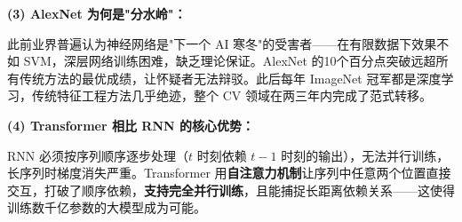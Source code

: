 \documentclass[a4paper,11pt]{ctexart}
\begin{document}
\begin{solutionbox}[参考答案与详细解析]
    \textbf{(3) AlexNet 为何是"分水岭"：}

    此前业界普遍认为神经网络是"下一个 AI 寒冬"的受害者——在有限数据下效果不如 SVM，深层网络训练困难，缺乏理论保证。AlexNet 的10个百分点突破远超所有传统方法的最优成绩，让怀疑者无法辩驳。此后每年 ImageNet 冠军都是深度学习，传统特征工程方法几乎绝迹，整个 CV 领域在两三年内完成了范式转移。

    \textbf{(4) Transformer 相比 RNN 的核心优势：}

    RNN 必须按序列顺序逐步处理（$t$ 时刻依赖 $t-1$ 时刻的输出），无法并行训练，长序列时梯度消失严重。Transformer 用\textbf{自注意力机制}让序列中任意两个位置直接交互，打破了顺序依赖，\textbf{支持完全并行训练}，且能捕捉长距离依赖关系——这使得训练数千亿参数的大模型成为可能。
\end{solutionbox}
\end{document}
